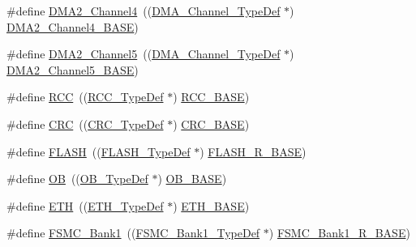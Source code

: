 \begin{DoxyCompactItemize}
\item 
\#define \mbox{\hyperlink{group___peripheral__declaration_ga612b396657695191ad740b0b59bc9f12}{D\+M\+A2\+\_\+\+Channel4}}~((\mbox{\hyperlink{struct_d_m_a___channel___type_def}{D\+M\+A\+\_\+\+Channel\+\_\+\+Type\+Def}} $\ast$) \mbox{\hyperlink{group___peripheral__memory__map_ga01b063266473f290a55047654fbbfbee}{D\+M\+A2\+\_\+\+Channel4\+\_\+\+B\+A\+SE}})
\item 
\#define \mbox{\hyperlink{group___peripheral__declaration_ga521c13b7d0f82a6897d47995da392750}{D\+M\+A2\+\_\+\+Channel5}}~((\mbox{\hyperlink{struct_d_m_a___channel___type_def}{D\+M\+A\+\_\+\+Channel\+\_\+\+Type\+Def}} $\ast$) \mbox{\hyperlink{group___peripheral__memory__map_ga1eea983a5d68bf36f4d19fbb07955ca1}{D\+M\+A2\+\_\+\+Channel5\+\_\+\+B\+A\+SE}})
\item 
\#define \mbox{\hyperlink{group___peripheral__declaration_ga74944438a086975793d26ae48d5882d4}{R\+CC}}~((\mbox{\hyperlink{struct_r_c_c___type_def}{R\+C\+C\+\_\+\+Type\+Def}} $\ast$) \mbox{\hyperlink{group___peripheral__memory__map_ga0e681b03f364532055d88f63fec0d99d}{R\+C\+C\+\_\+\+B\+A\+SE}})
\item 
\#define \mbox{\hyperlink{group___peripheral__declaration_ga4381bb54c2dbc34500521165aa7b89b1}{C\+RC}}~((\mbox{\hyperlink{struct_c_r_c___type_def}{C\+R\+C\+\_\+\+Type\+Def}} $\ast$) \mbox{\hyperlink{group___peripheral__memory__map_ga656a447589e785594cbf2f45c835ad7e}{C\+R\+C\+\_\+\+B\+A\+SE}})
\item 
\#define \mbox{\hyperlink{group___peripheral__declaration_ga844ea28ba1e0a5a0e497f16b61ea306b}{F\+L\+A\+SH}}~((\mbox{\hyperlink{struct_f_l_a_s_h___type_def}{F\+L\+A\+S\+H\+\_\+\+Type\+Def}} $\ast$) \mbox{\hyperlink{group___peripheral__memory__map_ga8e21f4845015730c5731763169ec0e9b}{F\+L\+A\+S\+H\+\_\+\+R\+\_\+\+B\+A\+SE}})
\item 
\#define \mbox{\hyperlink{group___peripheral__declaration_gad2d5f875cdc6d696735f20fa23a895c3}{OB}}~((\mbox{\hyperlink{struct_o_b___type_def}{O\+B\+\_\+\+Type\+Def}} $\ast$) \mbox{\hyperlink{group___peripheral__memory__map_gab5b5fb155f9ee15dfb6d757da1adc926}{O\+B\+\_\+\+B\+A\+SE}})
\item 
\#define \mbox{\hyperlink{group___peripheral__declaration_ga3a3f60de4318afbd0b3318e7a416aadc}{E\+TH}}~((\mbox{\hyperlink{struct_e_t_h___type_def}{E\+T\+H\+\_\+\+Type\+Def}} $\ast$) \mbox{\hyperlink{group___peripheral__memory__map_gad965a7b1106ece575ed3da10c45c65cc}{E\+T\+H\+\_\+\+B\+A\+SE}})
\item 
\#define \mbox{\hyperlink{group___peripheral__declaration_ga2a759bad07fe730c99f9e1490e646220}{F\+S\+M\+C\+\_\+\+Bank1}}~((\mbox{\hyperlink{struct_f_s_m_c___bank1___type_def}{F\+S\+M\+C\+\_\+\+Bank1\+\_\+\+Type\+Def}} $\ast$) \mbox{\hyperlink{group___peripheral__memory__map_gad196fe6f5e4041b201d14f43508c06d2}{F\+S\+M\+C\+\_\+\+Bank1\+\_\+\+R\+\_\+\+B\+A\+SE}})

\end{DoxyCompactItemize}
